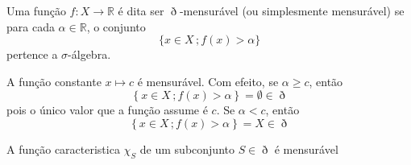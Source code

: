 \documentclass[a4paper, 11pt]{book}
\theoremstyle{definition}
\begin{document}



\begin{dbox}
    Uma função $f : X \to \mathbb R$ é dita ser $\eth$-mensurável (ou simplesmente mensurável) se para cada $\alpha \in \mathbb{R}$, o conjunto
    \[
        \{x \in X \,; f(x) > \alpha\}
    \]
    pertence a $\sigma$-álgebra.
\end{dbox}

\begin{ex}
    A função constante $x \mapsto c$ é mensurável.
    Com efeito, se $\alpha \geqslant c$, então
    \[
        \left\{ x \in X \,; f(x) > \alpha \right\} = \emptyset \in \eth
    \]
    pois o único valor que a função assume é $c$.
    Se $\alpha < c$, então
    \[
        \left\{ x \in X \,; f(x) > \alpha \right\} = X \in \eth
    \]
\end{ex}

\begin{ex}
    A função caracteristica $\chi_S$ de um subconjunto $S \in \eth$ é mensurável
\end{ex}
\end{document}
